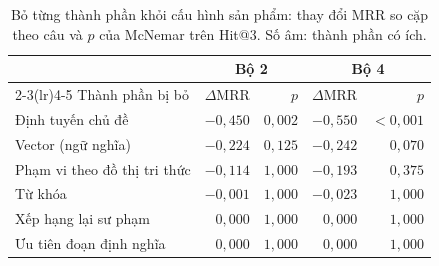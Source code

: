 \begin{table}[H]
\centering
\caption{Bỏ từng thành phần khỏi cấu hình sản phẩm: thay đổi MRR so cặp theo câu và $p$ của McNemar trên Hit@3. Số âm: thành phần có ích.}\label{tab:rag-components}
\small
\begin{tabular}{lrrrr}
\toprule
 & \multicolumn{2}{c}{Bộ 2} & \multicolumn{2}{c}{Bộ 4} \\
\cmidrule(lr){2-3}\cmidrule(lr){4-5}
Thành phần bị bỏ & $\Delta$MRR & $p$ & $\Delta$MRR & $p$ \\
\midrule
Định tuyến chủ đề & $-0{,}450$ & $0{,}002$ & $-0{,}550$ & $<0{,}001$ \\
Vector (ngữ nghĩa) & $-0{,}224$ & $0{,}125$ & $-0{,}242$ & $0{,}070$ \\
Phạm vi theo đồ thị tri thức & $-0{,}114$ & $1{,}000$ & $-0{,}193$ & $0{,}375$ \\
Từ khóa & $-0{,}001$ & $1{,}000$ & $-0{,}023$ & $1{,}000$ \\
Xếp hạng lại sư phạm & $0{,}000$ & $1{,}000$ & $0{,}000$ & $1{,}000$ \\
Ưu tiên đoạn định nghĩa & $0{,}000$ & $1{,}000$ & $0{,}000$ & $1{,}000$ \\
\bottomrule
\end{tabular}
\end{table}
